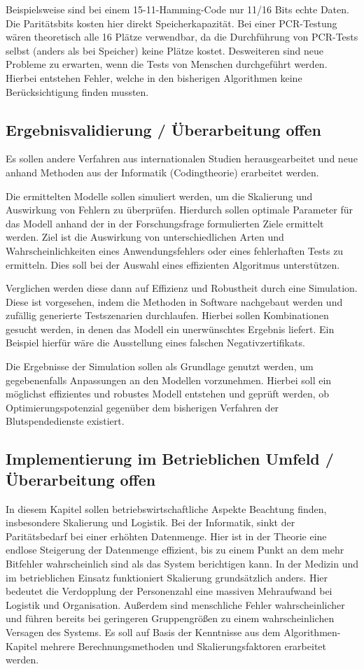 Beispielsweise sind bei einem 15-11-Hamming-Code nur 11/16 Bits echte Daten.
Die Paritätsbits kosten hier direkt Speicherkapazität.
Bei einer PCR-Testung wären theoretisch alle 16 Plätze verwendbar, da die Durchführung von PCR-Tests selbst (anders als bei Speicher) keine Plätze kostet.
Desweiteren sind neue Probleme zu erwarten, wenn die Tests von Menschen durchgeführt werden.
Hierbei entstehen Fehler, welche in den bisherigen Algorithmen keine Berücksichtigung finden mussten.

\subsection{Ergebnisvalidierung / Überarbeitung offen}
Es sollen andere Verfahren aus internationalen Studien herausgearbeitet und neue anhand Methoden aus der Informatik (Codingtheorie) erarbeitet werden. 

Die ermittelten Modelle sollen simuliert werden, um die Skalierung und Auswirkung von Fehlern zu überprüfen.
Hierdurch sollen optimale Parameter für das Modell anhand der in der Forschungsfrage formulierten Ziele ermittelt werden.
Ziel ist die Auswirkung von unterschiedlichen Arten und Wahrscheinlichkeiten eines Anwendungsfehlers oder eines fehlerhaften Tests zu ermitteln.
Dies soll bei der Auswahl eines effizienten Algoritmus unterstützen.

Verglichen werden diese dann auf Effizienz und Robustheit durch eine Simulation.
Diese ist vorgesehen, indem die Methoden in Software nachgebaut werden und zufällig generierte Testszenarien durchlaufen.
Hierbei sollen Kombinationen gesucht werden, in denen das Modell ein unerwünschtes Ergebnis liefert.
Ein Beispiel hierfür wäre die Ausstellung eines falschen Negativzertifikats.

Die Ergebnisse der Simulation sollen als Grundlage genutzt werden, um gegebenenfalls Anpassungen an den Modellen vorzunehmen.
Hierbei soll ein möglichst effizientes und robustes Modell entstehen und geprüft werden, ob Optimierungspotenzial gegenüber dem bisherigen Verfahren der Blutspendedienste existiert.

\subsection{Implementierung im Betrieblichen Umfeld / Überarbeitung offen}
In diesem Kapitel sollen betriebswirtschaftliche Aspekte Beachtung finden, insbesondere Skalierung und Logistik.
Bei der Informatik, sinkt der Paritätsbedarf bei einer erhöhten Datenmenge.
Hier ist in der Theorie eine endlose Steigerung der Datenmenge effizient, bis zu einem Punkt an dem mehr Bitfehler wahrscheinlich sind als das System berichtigen kann.
In der Medizin und im betrieblichen Einsatz funktioniert Skalierung grundsätzlich anders.
Hier bedeutet die Verdopplung der Personenzahl eine massiven Mehraufwand bei Logistik und Organisation.
Außerdem sind menschliche Fehler wahrscheinlicher und führen bereits bei geringeren Gruppengrößen zu einem wahrscheinlichen Versagen des Systems.
Es soll auf Basis der Kenntnisse aus dem Algorithmen-Kapitel mehrere Berechnungsmethoden und Skalierungsfaktoren erarbeitet werden.

